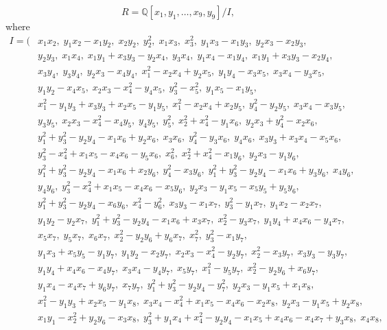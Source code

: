 \documentclass[a4paper]{amsart}
\theoremstyle{definition}
\theoremstyle{remark}
\numberwithin{equation}{section}
\begin{document}
\[
R=\mathbb{Q}[x_1,y_1,\ldots,x_9,y_9]/I,
\]
where
{\small
\allowdisplaybreaks[4]
\begin{align*}
I=\bigl(& x_1x_2,\; y_1x_2-x_1y_2,\; x_2y_2,\; y_2^2,\; x_1x_3,\; x_3^2,\; y_1x_3-x_1y_3,\; y_2x_3-x_2y_3,\\[-0.2ex]
& y_2y_3,\; x_1x_4,\; x_1y_1+x_3y_3-y_2x_4,\; y_3x_4,\; y_1x_4-x_1y_4,\; x_1y_1+x_3y_3-x_2y_4,\\[-0.2ex]
& x_3y_4,\; y_3y_4,\; y_2x_3-x_4y_4,\; x_1^2-x_2x_4+y_2x_5,\; y_1y_4-x_3x_5,\; x_3x_4-y_3x_5,\\[-0.2ex]
& y_1y_2-x_4x_5,\; x_2x_3-x_4^2-y_4x_5,\; y_3^2-x_5^2,\; y_1x_5-x_1y_5,\\[-0.2ex]
& x_1^2-y_1y_3+x_3y_3+x_2x_5-y_1y_5,\; x_1^2-x_2x_4+x_2y_5,\; y_4^2-y_2y_5,\; x_3x_4-x_3y_5,\\[-0.2ex]
& y_3y_5,\; x_2x_3-x_4^2-x_4y_5,\; y_4y_5,\; y_5^2,\; x_2^2+x_4^2-y_1x_6,\; y_2x_3+y_4^2-x_2x_6,\\[-0.2ex]
& y_1^2+y_3^2-y_2y_4-x_1x_6+y_2x_6,\; x_3x_6,\; y_4^2-y_3x_6,\; y_4x_6,\; x_3y_3+x_3x_4-x_5x_6,\\[-0.2ex]
& y_3^2-x_4^2+x_1x_5-x_4x_6-y_5x_6,\; x_6^2,\; x_2^2+x_4^2-x_1y_6,\; y_2x_3-y_1y_6,\\[-0.2ex]
& y_1^2+y_3^2-y_2y_4-x_1x_6+x_2y_6,\; y_4^2-x_3y_6,\; y_1^2+y_3^2-y_2y_4-x_1x_6+y_3y_6,\; x_4y_6,\\[-0.2ex]
& y_4y_6,\; y_3^2-x_4^2+x_1x_5-x_4x_6-x_5y_6,\; y_2x_3-y_1x_5-x_5y_5+y_5y_6,\\[-0.2ex]
& y_1^2+y_3^2-y_2y_4-x_6y_6,\; x_4^2-y_6^2,\; x_3y_3-x_1x_7,\; y_3^2-y_1x_7,\; y_1x_2-x_2x_7,\\[-0.2ex]
& y_1y_2-y_2x_7,\; y_1^2+y_3^2-y_2y_4-x_1x_6+x_3x_7,\; x_2^2-y_3x_7,\; y_1y_4+x_4x_6-y_4x_7,\\[-0.2ex]
& x_5x_7,\; y_5x_7,\; x_6x_7,\; x_2^2-y_2y_6+y_6x_7,\; x_7^2,\; y_3^2-x_1y_7,\\[-0.2ex]
& y_1x_3+x_5y_5-y_1y_7,\; y_1y_2-x_2y_7,\; x_2x_3-x_4^2-y_2y_7,\; x_2^2-x_3y_7,\; x_3y_3-y_3y_7,\\[-0.2ex]
& y_1y_4+x_4x_6-x_4y_7,\; x_3x_4-y_4y_7,\; x_5y_7,\; x_1^2-y_5y_7,\; x_2^2-y_2y_6+x_6y_7,\\[-0.2ex]
& y_1x_4-x_4x_7+y_6y_7,\; x_7y_7,\; y_1^2+y_3^2-y_2y_4-y_7^2,\; y_2x_3-y_1x_5+x_1x_8,\\[-0.2ex]
& x_1^2-y_1y_3+x_2x_5-y_1x_8,\; x_3x_4-x_4^2+x_1x_5-x_4x_6-x_2x_8,\; y_2x_3-y_1x_5+y_2x_8,\\[-0.2ex]
& x_1y_1-x_2^2+y_2y_6-x_3x_8,\; y_3^2+y_1x_4+x_4^2-y_2y_4-x_1x_5+x_4x_6-x_4x_7+y_3x_8,\; x_4x_8,\\[-0.2ex]

\end{align*}}
\end{document}
